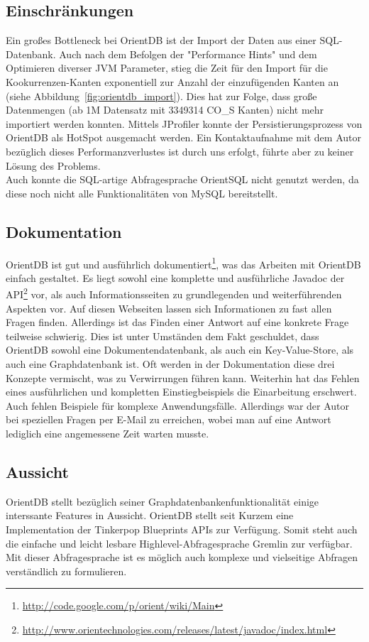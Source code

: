 \documentclass[11pt, a4paper, oneside]{article} %
\begin{document}
\subsection{Einschränkungen}
Ein großes Bottleneck bei OrientDB ist der Import der Daten aus einer SQL-Datenbank. Auch nach dem Befolgen der "Performance Hints" und dem Optimieren diverser JVM Parameter, stieg die Zeit für den Import für die Kookurrenzen-Kanten exponentiell zur Anzahl der einzufügenden Kanten an (siehe Abbildung~\ref{fig:orientdb_import}). Dies hat zur Folge, dass große Datenmengen (ab 1M Datensatz mit 3349314 CO\_{}S Kanten) nicht mehr importiert werden konnten. Mittels JProfiler konnte der Persistierungsprozess von OrientDB als HotSpot ausgemacht werden. Ein Kontaktaufnahme mit dem Autor bezüglich dieses Performanzverlustes ist durch uns erfolgt, führte aber zu keiner Lösung des Problems.\\
Auch konnte die SQL-artige Abfragesprache OrientSQL nicht genutzt werden, da diese noch nicht alle Funktionalitäten von MySQL bereitstellt.

\subsection{Dokumentation}
OrientDB ist gut und ausführlich dokumentiert\footnote{\url{http://code.google.com/p/orient/wiki/Main}}, was das Arbeiten mit OrientDB einfach gestaltet. Es liegt sowohl eine komplette und ausführliche Javadoc der API\footnote{\url{http://www.orientechnologies.com/releases/latest/javadoc/index.html}} vor, als auch Informationsseiten zu grundlegenden und weiterführenden Aspekten vor. Auf diesen Webseiten lassen sich Informationen zu fast allen Fragen finden. Allerdings ist das Finden einer Antwort auf eine konkrete Frage teilweise schwierig. Dies ist unter Umständen dem Fakt geschuldet, dass OrientDB sowohl eine Dokumentendatenbank, als auch ein Key-Value-Store, als auch eine Graphdatenbank ist. Oft werden in der Dokumentation diese drei Konzepte vermischt, was zu Verwirrungen führen kann. Weiterhin hat das Fehlen eines ausführlichen und kompletten Einstiegbeispiels die Einarbeitung erschwert. Auch fehlen Beispiele für komplexe Anwendungsfälle. Allerdings war der Autor bei speziellen Fragen per E-Mail zu erreichen, wobei man auf eine Antwort lediglich eine angemessene Zeit warten musste.

\subsection{Aussicht}
OrientDB stellt bezüglich seiner Graphdatenbankenfunktionalität einige interssante Features in Aussicht. OrientDB stellt seit Kurzem eine Implementation der Tinkerpop Blueprints APIs zur Verfügung. Somit steht auch die einfache und leicht lesbare Highlevel-Abfragesprache Gremlin zur verfügbar. Mit dieser Abfragesprache ist es möglich auch komplexe und vielseitige Abfragen verständlich zu formulieren.
\end{document}
